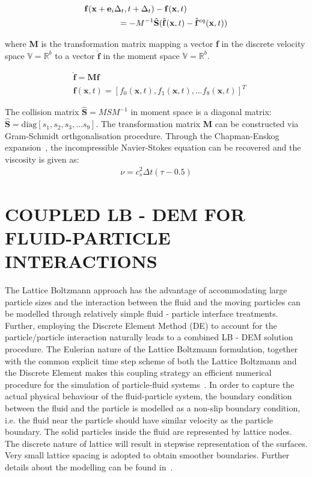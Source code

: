 \documentclass[12pt,a4paper,twocolumn,fleqn]{narms}
\begin{document}
\begin{align}
&\mathbf{f}(\mathbf{x}+\mathbf{e}_i\Delta_t, t+ \Delta_t)-\mathbf{f}(\mathbf{x},t) \nonumber \\
&\mbox{\qquad\qquad} = -M^{-1}\hat{\mathbf{S}} (\hat{\mathbf{f}}(\mathbf{x},t)-\hat{\mathbf{f}}^{eq}(\mathbf{x},t))
\end{align}

\noindent where \textbf{M} is the transformation matrix mapping a vector \textbf{f} in the discrete velocity space $\mathds{V}=\mathds{R}^b$ to a vector $\hat{\mathbf{f}}$ in the moment space $\mathds{V}=\mathds{R}^b$.

\begin{align}
&\hat{\mathbf{f}} = \mathbf{M}\mathbf{f}\\
&\mathbf{f}(\mathbf{x},t) = \left[f_0(\mathbf{x},t),f_1(\mathbf{x},t),\dots f_8(\mathbf{x},t)\right]^T
\end{align}

The collision matrix $\hat{\mathbf{S}} = MSM^{-1}$ in moment space is a diagonal matrix: $\hat{\mathbf{S}} =\mbox{diag} \left[ s_1, s_2, s_3,\dots s_9  \right]$. The transformation matrix \textbf{M} can be constructed via Gram-Schmidt orthgonalisation procedure. Through the Chapman-Enskog expansion~, the incompressible Navier-Stokes equation can be recovered and the viscosity is given as:
\begin{align}
\nu=c_s^2\Delta t(\tau-0.5)
\end{align}

\section{COUPLED LB - DEM FOR FLUID-PARTICLE INTERACTIONS}
The Lattice Boltzmann approach has the advantage of accommodating large particle sizes and the interaction between the fluid and the moving particles can be modelled through relatively simple fluid - particle interface treatments. Further, employing the Discrete Element Method (DE) to account for the particle/particle interaction naturally leads to a combined LB - DEM solution procedure. The Eulerian nature of the Lattice Boltzmann formulation, together with the common explicit time step scheme of both the Lattice Boltzmann and the Discrete Element makes this coupling strategy an efficient numerical procedure for the simulation of particle-fluid systems~. In order to capture the actual physical behaviour of the fluid-particle system, the boundary condition between the fluid and the particle is modelled as a non-slip boundary condition, i.e. the fluid near the particle should have similar velocity as the particle boundary. The solid particles inside the fluid are represented by lattice nodes. The discrete nature of lattice will result in stepwise representation of the surfaces. Very small lattice spacing is adopted to obtain smoother boundaries. Further details about the modelling can be found in~.
\end{document}
